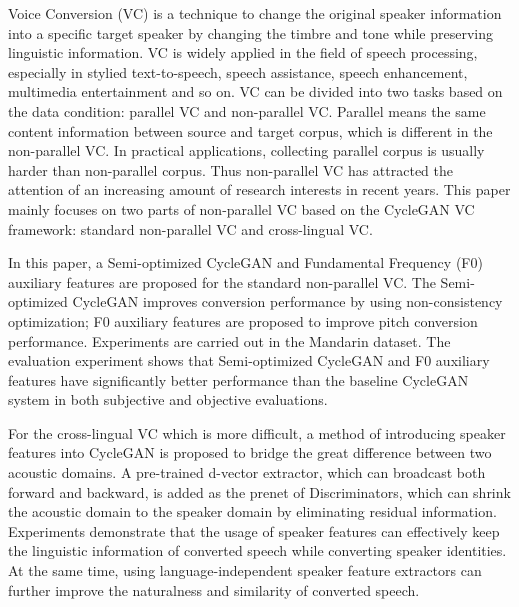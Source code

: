 \begin{enabstract}
  Voice Conversion (VC) is a technique to change the original speaker information 
  into a specific target speaker by changing the timbre and tone while preserving 
  linguistic information. VC is widely applied in the field of speech processing, 
  especially in stylied text-to-speech, speech assistance, speech enhancement, 
  multimedia entertainment and so on. VC can be divided into two tasks based on the 
  data condition: parallel VC and non-parallel VC. Parallel means the same content
  information between source and target corpus, which is different in the non-parallel VC.
  In practical applications, collecting parallel corpus is usually harder than non-parallel
  corpus. Thus non-parallel VC has attracted the attention of an increasing amount of research 
  interests in recent years. This paper mainly focuses on two parts of non-parallel VC based
  on the CycleGAN VC framework: standard non-parallel VC and cross-lingual VC.

  In this paper, a Semi-optimized CycleGAN and Fundamental Frequency (F0) auxiliary features are
  proposed for the standard non-parallel VC. The Semi-optimized CycleGAN improves conversion 
  performance by using non-consistency optimization; F0 auxiliary features are proposed 
  to improve pitch conversion performance. Experiments are carried out in the Mandarin dataset. 
  The evaluation experiment shows that Semi-optimized CycleGAN and F0 auxiliary features have 
  significantly better performance than the baseline CycleGAN system in both subjective and objective
  evaluations.

  For the cross-lingual VC which is more difficult, a method of introducing speaker features into 
  CycleGAN is proposed to bridge the great difference between two acoustic domains. A pre-trained d-vector 
  extractor, which can broadcast both forward and backward, is added as the prenet of Discriminators, 
  which can shrink the acoustic domain to the speaker domain by eliminating residual information.
  Experiments demonstrate that the usage of speaker features can effectively keep the linguistic
  information of converted speech while converting speaker identities. At the same time, 
  using language-independent speaker feature extractors can further improve the naturalness and similarity 
  of converted speech.


\end{enabstract}
